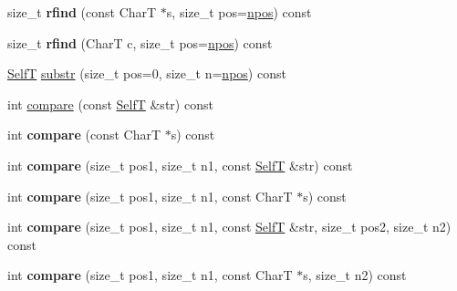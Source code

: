 \begin{CompactItemize}
\item 
\hypertarget{classvector__string_4dcd8e5d2421bdbbedd0427a14cd053b}{
size\_\-t \textbf{rfind} (const CharT $\ast$s, size\_\-t pos=\hyperlink{classvector__string_073b48043937e79ead0703a49426be1a}{npos}) const }
\label{classvector__string_4dcd8e5d2421bdbbedd0427a14cd053b}

\item 
\hypertarget{classvector__string_3a329d59902ba29e9303972c077f7346}{
size\_\-t \textbf{rfind} (CharT c, size\_\-t pos=\hyperlink{classvector__string_073b48043937e79ead0703a49426be1a}{npos}) const }
\label{classvector__string_3a329d59902ba29e9303972c077f7346}

\item 
\hyperlink{classvector__string}{SelfT} \hyperlink{classvector__string_0d46d44039a39232b4c3611920a43653}{substr} (size\_\-t pos=0, size\_\-t n=\hyperlink{classvector__string_073b48043937e79ead0703a49426be1a}{npos}) const 
\item 
int \hyperlink{classvector__string_1604ed59691edc6579fadedf04fa4cbb}{compare} (const \hyperlink{classvector__string}{SelfT} \&str) const 
\item 
\hypertarget{classvector__string_5d4284a5b9b5fba01d4183f68eabc164}{
int \textbf{compare} (const CharT $\ast$s) const }
\label{classvector__string_5d4284a5b9b5fba01d4183f68eabc164}

\item 
\hypertarget{classvector__string_35bbe51b72056f5743bfb8767cbc369d}{
int \textbf{compare} (size\_\-t pos1, size\_\-t n1, const \hyperlink{classvector__string}{SelfT} \&str) const }
\label{classvector__string_35bbe51b72056f5743bfb8767cbc369d}

\item 
\hypertarget{classvector__string_dd3368c09817da7096ad1ff769b7990e}{
int \textbf{compare} (size\_\-t pos1, size\_\-t n1, const CharT $\ast$s) const }
\label{classvector__string_dd3368c09817da7096ad1ff769b7990e}

\item 
\hypertarget{classvector__string_0650af0df14513c5cac984cc07c89ecc}{
int \textbf{compare} (size\_\-t pos1, size\_\-t n1, const \hyperlink{classvector__string}{SelfT} \&str, size\_\-t pos2, size\_\-t n2) const }
\label{classvector__string_0650af0df14513c5cac984cc07c89ecc}

\item 
\hypertarget{classvector__string_fa8dd56e0b0459be757e2ee32779332a}{
int \textbf{compare} (size\_\-t pos1, size\_\-t n1, const CharT $\ast$s, size\_\-t n2) const }
\label{classvector__string_fa8dd56e0b0459be757e2ee32779332a}


\end{CompactItemize}
